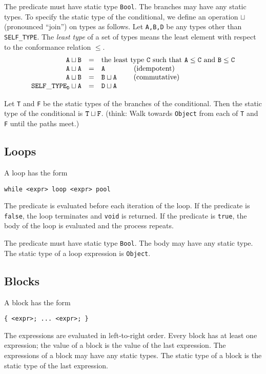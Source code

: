 \documentclass[11pt]{article}
\newcommand{\tab}{\hspace*{2em}}
\newcommand {\m}{\mbox}
\newcommand{\styp}{{\tt SELF\_TYPE}}
\begin{document}
The predicate must have static type {\tt Bool}.  The branches may have any static types.
To specify the static type of the conditional, we define an operation $\sqcup$
(pronounced ``join'') on types as follows.  Let {\tt A,B,D} be any types other than \styp.  The {\em least type} of a set of types means the least element
with respect to the conformance relation $\leq$.
\[
\begin{array}{rcl}
\tt A \sqcup B & = & \tt \m{\rm the least type\ } C \m{\rm \ such that\ }
	 A \leq C \m{\rm\ and } B \leq C \\
\tt A \sqcup A & = & \tt A                     \hbox{\tab \tab (idempotent)} \\
\tt A \sqcup B & = & \tt B \sqcup A            \hbox{\tab \ (commutative)} \\
\tt \styp_D \sqcup A & = & \tt D \sqcup A \\
\end{array}
\]

Let {\tt T} and {\tt F} be the static types of the branches of the conditional.
Then the static type of the conditional is $\tt T \sqcup F$.  (think: Walk
towards {\tt Object} from each of {\tt T} and {\tt F} until the paths meet.)

\subsection{Loops}
A loop has the form
\begin{verbatim}
while <expr> loop <expr> pool
\end{verbatim}
The predicate is evaluated before each iteration of the loop.
If the predicate is {\tt false}, the loop terminates and {\tt void}
is returned.  If the predicate is {\tt true},
the body of the loop is evaluated and the process repeats.

The predicate must have static type {\tt Bool}.  The body may have any
static type.  The static type of a loop expression is {\tt Object}.

\subsection{Blocks}
A block has the form
\begin{verbatim}
{ <expr>; ... <expr>; }
\end{verbatim}
The expressions are evaluated in left-to-right order.  Every block has
at least one expression; the value of a block is the value of the last
expression.  The expressions of a block may have any static types.
The static type of a block is the static type of the last expression.
\end{document}
